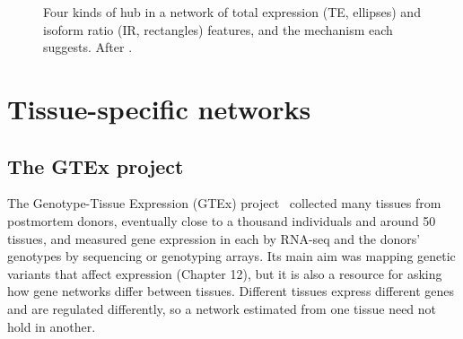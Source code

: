 \begin{figure}[tbp]
  \centering
  \caption{Four kinds of hub in a network of total expression (TE, ellipses) and isoform ratio (IR, rectangles) features, and the mechanism each suggests. After \citet{saha2017}.}
  \label{fig:hubs}
\end{figure}

\section{Tissue-specific networks}
\label{sec:gtex}

\subsection{The GTEx project}

The Genotype-Tissue Expression (GTEx) project~\citep{gtex2013,gtex2015,gtex2020} collected many tissues from postmortem donors, eventually close to a thousand individuals and around 50 tissues, and measured gene expression in each by RNA-seq and the donors' genotypes by sequencing or genotyping arrays. Its main aim was mapping genetic variants that affect expression (Chapter 12), but it is also a resource for asking how gene networks differ between tissues. Different tissues express different genes and are regulated differently, so a network estimated from one tissue need not hold in another.

